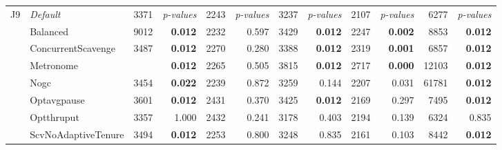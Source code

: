 \begin{table*}
{\begin{tabular}{cl|rr|rr|rr|rr|rr}
			\hline
			\multirow{9}{*}{J9}
			    & \em Default         & 3371                    & \em p-values               & 2243                      & \em p-values           & 3237                      & \em p-values & 2107       & \em p-values & 6277       & \em p-values \\
			    & Balanced            & 9012                    & \bf 0.012                  & 2232                      & 0.597                  & 3429                      & \bf 0.012    & 2247       & \bf 0.002    & 8853       & \bf 0.012    \\
			    & ConcurrentScavenge  & 3487                    & \bf 0.012                  & 2270                      & 0.280                  & 3388                      & \bf 0.012    & 2319       & \bf 0.001    & 6857       & \bf 0.012    \\
			    & Metronome           & \best 2098              & \bf 0.012                  & 2265                      & 0.505                  & 3815                      & \bf 0.012    & 2717       & \bf 0.000    & 12103      & \bf 0.012    \\
			    & Nogc                & 3454                    & \bf 0.022                  & 2239                      & 0.872                  & 3259                      & 0.144        & 2207       & 0.031        & 61781      & \bf 0.012    \\
			    & Optavgpause         & 3601                    & \bf 0.012                  & 2431                      & 0.370                  & 3425                      & \bf 0.012    & 2169       & 0.297        & 7495       & \bf 0.012    \\
			    & Optthruput          & 3357                    & 1.000                      & 2432                      & 0.241                  & 3178                      & 0.403        & 2194       & 0.139        & 6324       & 0.835        \\
			    & ScvNoAdaptiveTenure & 3494                    & \bf 0.012                  & 2253                      & 0.800                  & 3248                      & 0.835        & 2161       & 0.103        & 8442       & \bf 0.012    \\


\end{tabular}}
\end{table*}
